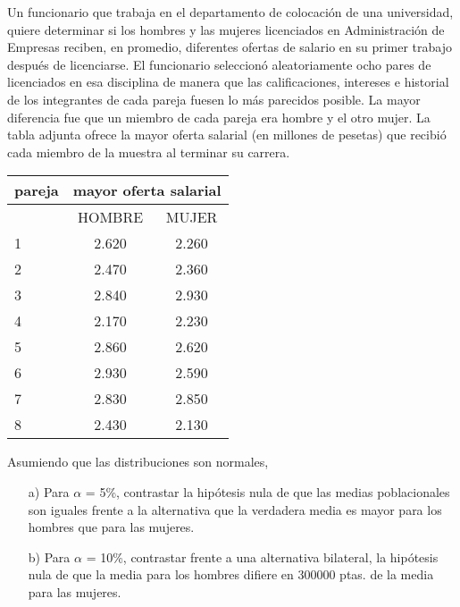 \begin{prob}%
    Un funcionario que trabaja en el departamento de colocaci\'on de
    una universidad, quiere determinar si los hombres y las mujeres
    licenciados en Administraci\'on de Empresas reciben, en promedio,
    diferentes ofertas de salario en su primer trabajo despu\'es de
    licenciarse. El funcionario seleccion\'o aleatoriamente ocho
    pares de licenciados en esa disciplina de manera que las
    calificaciones, intereses e historial de los integrantes de cada
    pareja fuesen lo m\'as parecidos posible. La mayor diferencia fue
    que un miembro de cada pareja era hombre y el otro mujer. La tabla
    adjunta ofrece la mayor oferta salarial (en millones de pesetas)
    que recibi\'o cada miembro de la muestra al terminar su carrera.
    \begin{center}
        \begin{tabular}{l|cc}
        \hline
            pareja & \multicolumn{2}{c}{mayor oferta salarial}  \\
            \hline
                   & HOMBRE     & MUJER       \\
            \hline
            1      & 2.620      & 2.260       \\
            2      & 2.470      & 2.360       \\
            3      & 2.840      & 2.930       \\
        4      & 2.170      & 2.230       \\
        5      & 2.860      & 2.620       \\
        6      & 2.930      & 2.590       \\
        7      & 2.830      & 2.850       \\
        8      & 2.430      & 2.130       \\
            \hline
        \end{tabular}
    \end{center}
    Asumiendo que las distribuciones son normales,
    \begin{itemize}
        \item  [a)] Para $\alpha$ = 5\%, contrastar la hip\'otesis nula de
    que las medias poblacionales son iguales frente a la alternativa
    que la verdadera media es mayor para los hombres que para las
    mujeres.

        \item  [b)] Para $\alpha$ = 10\%, contrastar frente a una
        alternativa bilateral, la hip\'otesis nula de que la media
        para los hombres difiere en 300000 ptas. de la media para las
    mujeres.
    \end{itemize}
\end{prob}

